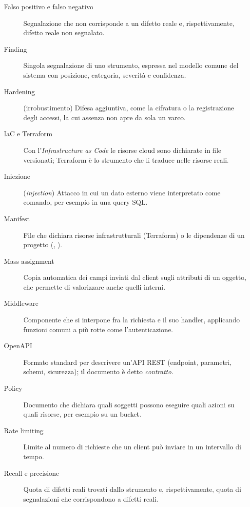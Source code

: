 {\begin{description}
  \item[Falso positivo e falso negativo] Segnalazione che non corrisponde a un
  difetto reale e, rispettivamente, difetto reale non segnalato.

  \item[Finding] Singola segnalazione di uno strumento, espressa nel modello
  comune del sistema con posizione, categoria, severità e confidenza.

  \item[Hardening] (irrobustimento) Difesa aggiuntiva, come la cifratura o la
  registrazione degli accessi, la cui assenza non apre da sola un varco.

  \item[IaC e Terraform] Con l'\emph{Infrastructure as Code} le risorse cloud
  sono dichiarate in file versionati; Terraform è lo strumento che li traduce
  nelle risorse reali.

  \item[Iniezione] (\emph{injection}) Attacco in cui un dato esterno viene
  interpretato come comando, per esempio in una query SQL.

  \item[Manifest] File che dichiara risorse infrastrutturali (Terraform) o le
  dipendenze di un progetto (, ).

  \item[Mass assignment] Copia automatica dei campi inviati dal client sugli
  attributi di un oggetto, che permette di valorizzare anche quelli interni.

  \item[Middleware] Componente che si interpone fra la richiesta e il suo
  handler, applicando funzioni comuni a più rotte come l'autenticazione.

  \item[OpenAPI] Formato standard per descrivere un'API REST (endpoint,
  parametri, schemi, sicurezza); il documento è detto \emph{contratto}.

  \item[Policy] Documento che dichiara quali soggetti possono eseguire quali
  azioni su quali risorse, per esempio su un bucket.

  \item[Rate limiting] Limite al numero di richieste che un client può inviare
  in un intervallo di tempo.

  \item[Recall e precisione] Quota di difetti reali trovati dallo strumento e,
  rispettivamente, quota di segnalazioni che corrispondono a difetti reali.


\end{description}}
